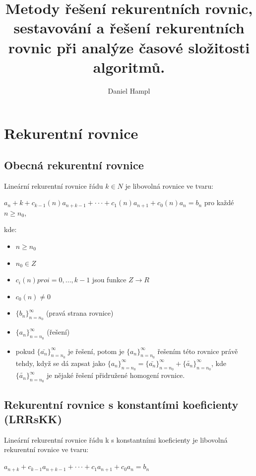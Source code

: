 \documentclass{szzclass}
\title{Metody řešení rekurentních rovnic, sestavování a   řešení rekurentních rovnic při analýze časové složitosti algoritmů.}
\author{Daniel Hampl}
\begin{document}
\maketitle

\tableofcontents
\newpage

\section{Rekurentní rovnice}

\subsection{Obecná rekurentní rovnice}

Lineární rekurentní rovnice řádu $k \in N$ je libovolná rovnice ve tvaru:

\begin{center}
$a_n+k + c_{k-1}(n) a_{n+k-1} + · · · + c_1(n) a_{n+1} + c_0(n) a_n = b_n$ pro každé $n \geq n_0$,
\end{center}


kde:
\begin{itemize}
    \item $n \geq n_0$
    \item $n_0 \in Z$
    \item $c_i(n) pro i = 0, . . . , k − 1$ jsou funkce $Z \rightarrow R$
    \item $c_0(n) \neq 0$
    \item $\{b_n\}^\infty_{n = n_0}$ (pravá strana rovnice)
    \item $\{a_n\}^\infty_{n=n_0}$ (řešení)
    \item pokud $\{\bar{a_n}\}^\infty_{n=n_0}$ je řešení, potom je $\{a_n\}^\infty_{n=n_0}$
    řešením této rovnice právě tehdy, když se dá zapsat jako
    $\{a_n\}^\infty_{n=n_0} = \{\bar{a_n}\}^\infty_{n=n_0} + \{\tilde{a_n}\}^\infty_{n=n_0}$,
    kde $\{\tilde{a_n}\}^\infty_{n=n_0}$ je nějaké řešení přidružené homogení rovnice.
\end{itemize}

\subsection{Rekurentní rovnice s konstantími koeficienty (LRRsKK)}

Lineární rekurentní rovnice řádu k s konstantními koeficienty je
libovolná rekurentní rovnice ve tvaru:

\begin{center}
$a_{n+k} + c_{k−1}a_{n+k−1} + · · · + c_1a_{n+1} + c_0a_n = b_n$ 
\end{center}
\end{document}
